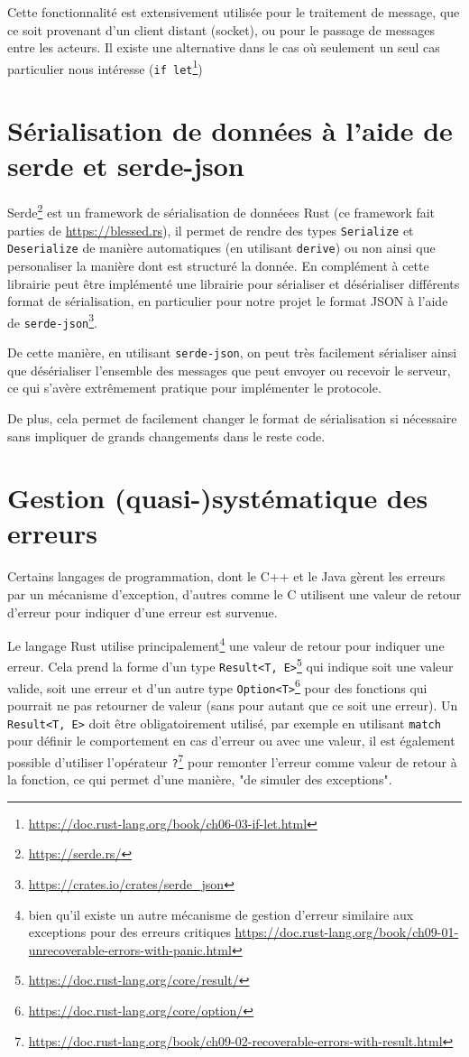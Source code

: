 \documentclass{EPUProjetDi}
\begin{document}
Cette fonctionnalité est extensivement utilisée pour le traitement de message, que ce soit provenant d'un client distant (socket), ou pour le passage de messages entre les acteurs. Il existe une alternative dans le cas où seulement un seul cas particulier nous intéresse (\verb|if let|\footnote{\url{https://doc.rust-lang.org/book/ch06-03-if-let.html}})

\section{Sérialisation de données à l'aide de serde et serde-json}

Serde\footnote{\url{https://serde.rs/}} est un framework de sérialisation de donnéees Rust (ce framework fait parties de \url{https://blessed.rs}), il permet de rendre des types \verb|Serialize| et \verb|Deserialize| de manière automatiques (en utilisant \verb|derive|) ou non ainsi que personaliser la manière dont est structuré la donnée. En complément à cette librairie peut être implémenté une librairie pour sérialiser et désérialiser différents format de sérialisation, en particulier pour notre projet le format JSON à l'aide de \verb|serde-json|\footnote{\url{https://crates.io/crates/serde_json}}.

De cette manière, en utilisant \verb|serde-json|, on peut très facilement sérialiser ainsi que désérialiser l'ensemble des messages que peut envoyer ou recevoir le serveur, ce qui s'avère extrêmement pratique pour implémenter le protocole.

De plus, cela permet de facilement changer le format de sérialisation si nécessaire sans impliquer de grands changements dans le reste code.

\section{Gestion (quasi-)systématique des erreurs}

Certains langages de programmation, dont le C++ et le Java gèrent les erreurs par un mécanisme d'exception, d'autres comme le C utilisent une valeur de retour d'erreur pour indiquer d'une erreur est survenue.

Le langage Rust utilise principalement\footnote{bien qu'il existe un autre mécanisme de gestion d'erreur similaire aux exceptions pour des erreurs critiques \url{https://doc.rust-lang.org/book/ch09-01-unrecoverable-errors-with-panic.html}} une valeur de retour pour indiquer une erreur. Cela prend la forme d'un type \verb|Result<T, E>|\footnote{\url{https://doc.rust-lang.org/core/result/}} qui indique soit une valeur valide, soit une erreur et d'un autre type \verb|Option<T>|\footnote{\url{https://doc.rust-lang.org/core/option/}} pour des fonctions qui pourrait ne pas retourner de valeur (sans pour autant que ce soit une erreur). Un \verb|Result<T, E>| doit être obligatoirement utilisé, par exemple en utilisant \verb|match| pour définir le comportement en cas d'erreur ou avec une valeur, il est également possible d'utiliser l'opérateur \verb|?|\footnote{\url{https://doc.rust-lang.org/book/ch09-02-recoverable-errors-with-result.html}} pour remonter l'erreur comme valeur de retour à la fonction, ce qui permet d'une manière, "de simuler des exceptions".
\end{document}
